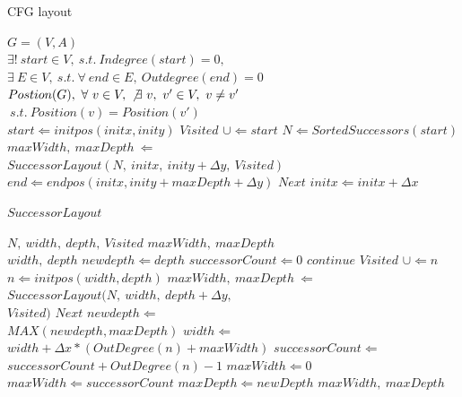 \documentclass[conference,10pt,twocolumn]{./IEEE/IEEEtran}
\begin{document}
\begin{algorithm}                      %
\caption{CFG layout}          %
\label{alg1}                           %
\begin{algorithmic}[1]               %

    \REQUIRE $G=(V,A)$\\ $\exists !\ start \in V,\ s.t.\ Indegree(start)=0,$\\ $\exists\ E \in V,\   s.t. \ \forall \ end \in E, \ Outdegree(end)=0$
    \ENSURE $Postion(G),\ \forall\ v\in V, \ \not\exists \ v,\ v' \in V,\  v \not= v'$\\$\ s.t. \ Position(v)=Position(v')$\\
    \STATE $start \Leftarrow initpos(initx,inity)$
\STATE $Visited$  $\cup \Leftarrow start$
\STATE $N \Leftarrow SortedSuccessors(start)$
 \STATE $maxWidth,\ maxDepth\  \Leftarrow$\\$SuccessorLayout(N,\ initx,\ inity+\Delta y,\ Visited)$ 
      \STATE $end \Leftarrow endpos(initx,inity+maxDepth+\Delta y)$
       \STATE $Next$	
        \STATE $initx \Leftarrow initx+\Delta x$
    \ENDFOR
\RETURN
\end{algorithmic}

\begin{algorithmic}
\STATE $ SuccessorLayout$
\end{algorithmic}


\begin{algorithmic}[1]
 \REQUIRE $N,\ width,\ depth,\ Visited$
    \ENSURE $maxWidth,\ maxDepth$\\
           \RETURN $width,\ depth$
        \ELSE
            \STATE $newdepth \Leftarrow depth$
            \STATE $successorCount \Leftarrow 0$
	\STATE $continue$
	\ENDIF
	\STATE $Visited$  $\cup \Leftarrow n$
	\STATE $n \Leftarrow initpos(width,depth)$
	\STATE $maxWidth,\ maxDepth\  \Leftarrow$\\$SuccessorLayout(N,\ width,\ depth+\Delta y,$\\$Visited)$
       \STATE $Next$	
	\STATE $newdepth \Leftarrow$\\$MAX(newdepth, maxDepth)$
	\STATE $width \Leftarrow$\\$width+\Delta x * (OutDegree(n)+maxWidth)$
	\STATE $successorCount \Leftarrow$\\$successorCount + OutDegree(n)-1$ 
\ENDFOR
	\STATE $maxWidth \Leftarrow 0$
	\ELSE
	\STATE $maxWidth \Leftarrow successorCount$
        \ENDIF
        \STATE $maxDepth \Leftarrow newDepth$
        \RETURN  $maxWidth,\ maxDepth$
\ENDIF
\end{algorithmic} 
\end{algorithm}
\end{document}
